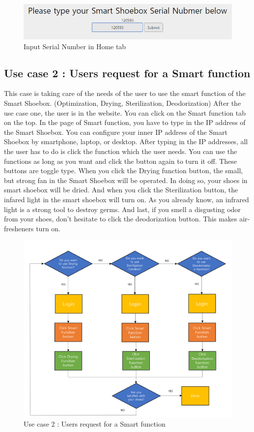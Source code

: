 \documentclass[conference]{IEEEtran}
\begin{document}
\begin{figure}[H]
\begin{center}
    \includegraphics[scale=0.35]{jh0}
     \caption{Input Serial Number in Home tab}\label{fig:label}
\end{center}
\end{figure}

\subsection{Use case 2 : Users request for a Smart function} This case is taking care of the needs of the user to use the smart function of the Smart Shoebox. (Optimization, Drying, Sterilization, Deodorization) After the use case one, the user is in the website. You can click on the Smart function tab on the top. In the page of Smart function, you have to type in the IP address of the Smart Shoebox. You can configure your inner IP address of the Smart Shoebox by smartphone, laptop, or desktop. After typing in the IP addresses, all the user has to do is click the function which the user needs. You can use the functions as long as you want and click the button again to turn it off. These buttons are toggle type. When you click the Drying function button, the small, but strong fan in the Smart Shoebox will be operated. In doing so, your shoes in smart shoebox will be dried. And when you click the Sterilization button, the infared light in the smart shoebox will turn on. As you already know, an infrared light is a strong tool to destroy germs. And last, if you smell a disgusting odor from your shoes, don't hesitate to click the deodorization button. This makes air-fresheners turn on.
\begin{figure}[H]
\begin{center}
    \includegraphics[scale=0.3]{usecase2}
    \caption{Use case 2 : Users request for a Smart function} \label{fig:label}
\end{center}
\end{figure}
\end{document}
